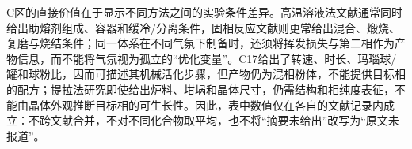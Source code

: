 C区的直接价值在于显示不同方法之间的实验条件差异。高温溶液法文献通常同时给出助熔剂组成、容器和缓冷/分离条件，固相反应文献则更常给出混合、煅烧、复磨与烧结条件；同一体系在不同气氛下制备时，还须将挥发损失与第二相作为产物信息，而不能将气氛视为孤立的“优化变量”\cite{redhammer2003beta,zou2021crystal,zou2019anti}。C17给出了转速、时长、玛瑙球/罐和球粉比，因而可描述其机械活化步骤，但产物仍为混相粉体，不能提供目标相的配方；提拉法研究即使给出炉料、坩埚和晶体尺寸，仍需结构和相纯度表征，不能由晶体外观推断目标相的可生长性\cite{tzvetkov2001effects,pang2005study,leonyuk1999high,shoudu1999czochralski}。因此，表中数值仅在各自的文献记录内成立：不跨文献合并，不对不同化合物取平均，也不将“摘要未给出”改写为“原文未报道”。
